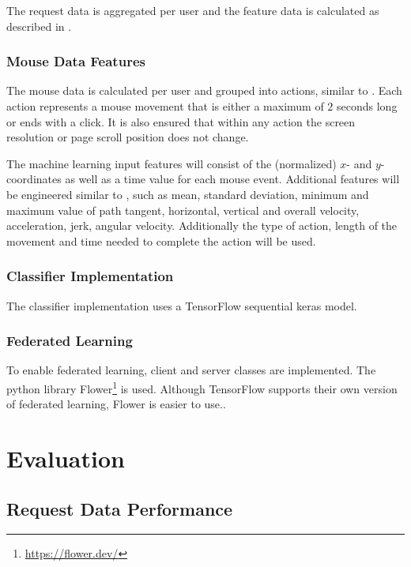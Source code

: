 \documentclass[
    fontsize=12pt,
    headings=small,
    parskip=half,           %
    bibliography=totoc,
    numbers=noenddot,       %
    open=any,               %
    final                   %
]{scrreprt}
\begin{document}
The request data is aggregated per user  and the feature data is calculated as described in .

\subsection{Mouse Data Features}

The mouse data is calculated per user and grouped into actions, similar to \cite{}. Each action represents a mouse movement that is either a maximum of $2$ seconds long or ends with a click. It is also ensured that within any action the screen resolution or page scroll position does not change.


The machine learning input features will consist of the (normalized) $x$- and $y$-coordinates as well as a time value for each mouse event. Additional features will be engineered similar to \cite{DBLP:journals/corr/abs-1810-04668}, such as mean, standard deviation, minimum and maximum value of path tangent, horizontal, vertical and overall velocity, acceleration, jerk, angular velocity. Additionally the type of action, length of the movement and time needed to complete the action will be used.
\todo

\subsection{Classifier Implementation}

The classifier implementation uses a TensorFlow sequential keras model.

\subsection{Federated Learning}

To enable federated learning, client and server classes are implemented. The python library Flower\footnote{\url{https://flower.dev/}} is used. Although TensorFlow supports their own version of federated learning, Flower is easier to use..\todo


\chapter{Evaluation}

\section{Request Data Performance}
\end{document}
